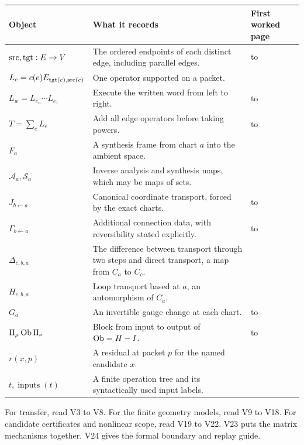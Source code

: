 {\small
\begin{tabularx}{\linewidth}{@{}p{.27\linewidth}Yp{.20\linewidth}@{}}\toprule
\textbf{Object} & \textbf{What it records} & \textbf{First worked page}\\\midrule
$\operatorname{src},\operatorname{tgt}:E\to V$ & The ordered endpoints of each distinct edge, including parallel edges. &  to \\
$L_e=c(e)E_{\operatorname{tgt}(e),\operatorname{src}(e)}$ & One operator supported on a packet. & \\
$L_w=L_{e_n}\cdots L_{e_1}$ & Execute the written word from left to right. &  to \\
$T=\sum_eL_e$ & Add all edge operators before taking powers. &  to \\
$F_a$ & A synthesis frame from chart $a$ into the ambient space. & \\
$\mathcal A_a,\mathcal S_a$ & Inverse analysis and synthesis maps, which may be maps of sets. & \\
$J_{b\leftarrow a}$ & Canonical coordinate transport, forced by the exact charts. &  to \\
$\Gamma_{b\leftarrow a}$ & Additional connection data, with reversibility stated explicitly. &  to \\
$\Delta_{c,b,a}$ & The difference between transport through two steps and direct transport, a map from $C_a$ to $C_c$. & \\
$H_{c,b,a}$ & Loop transport based at $a$, an automorphism of $C_a$. & \\
$G_a$ & An invertible gauge change at each chart. &  to \\
$\Pi_\mu\operatorname{Ob}\Pi_\nu$ & Block from input to output of $\operatorname{Ob}=H-I$. &  to \\
$r(x,p)$ & A residual at packet $p$ for the named candidate $x$. & \\
$t,\operatorname{inputs}(t)$ & A finite operation tree and its syntactically used input labels. & \\\bottomrule
\end{tabularx}}

For transfer, read V3 to V8. For the finite geometry models, read V9 to V18. For candidate certificates and nonlinear scope, read V19 to V22. V23 puts the matrix mechanisms together. V24 gives the formal boundary and replay guide.

